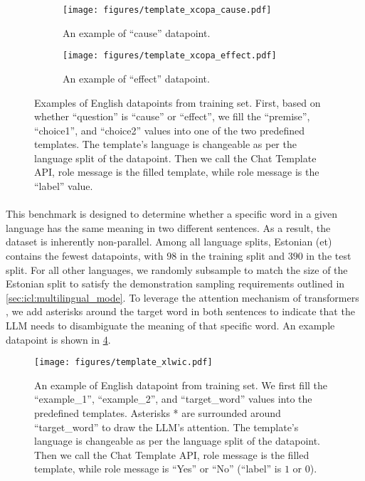 \begin{figure}[!t]
    \centering
    \begin{subfigure}[b]{\columnwidth}
        \centering
        \texttt{[image: figures/template\_xcopa\_cause.pdf]}
        \captionsetup{skip=1pt}
        \caption{An example of ``cause'' datapoint.}
        \label{fig:template:xcopa:cause}
    \end{subfigure}

    \begin{subfigure}[b]{\columnwidth}
        \centering
        \texttt{[image: figures/template\_xcopa\_effect.pdf]}
        \captionsetup{skip=1pt}
        \caption{An example of ``effect'' datapoint.}
        \label{fig:template:xcopa:effect}
    \end{subfigure}

    \caption{Examples of English datapoints from \xcopa training set. First, based on whether ``question'' is  ``cause'' or ``effect'', we fill the ``premise'', ``choice1'', and ``choice2'' values into one of the two predefined templates. The template's language is changeable as per the language split of the datapoint. Then we call the Chat Template API, \user role message is the filled template, while \assistant role message is the ``label'' value.}
    \label{fig:template:xcopa}
\end{figure}




\paragraph{\xlwic} This benchmark is designed to determine whether a specific word in a given language has the same meaning in two different sentences. As a result, the dataset is inherently non-parallel. Among all language splits, Estonian (et) contains the fewest datapoints, with $98$ in the training split and $390$ in the test split. For all other languages, we randomly subsample to match the size of the Estonian split to satisfy the demonstration sampling requirements outlined in \cref{sec:icl:multilingual_mode}. To leverage the attention mechanism of transformers \cite{transformer}, we add asterisks around the target word in both sentences to indicate that the LLM needs to disambiguate the meaning of that specific word. An example datapoint is shown in \cref{fig:template:xlwic}.

\begin{figure}[!t]
    \centering
    \texttt{[image: figures/template\_xlwic.pdf]}
    \caption{An example of English datapoint from \xlwic training set. We first fill the ``example\_1'', ``example\_2'', and ``target\_word'' values into the predefined templates. Asterisks * are surrounded around ``target\_word'' to draw the LLM's attention. The template's language is changeable as per the language split of the datapoint. Then we call the Chat Template API, \user role message is the filled template, while \assistant role message is ``Yes'' or ``No'' (``label'' is $1$ or $0$).}
    \label{fig:template:xlwic}
\end{figure}



